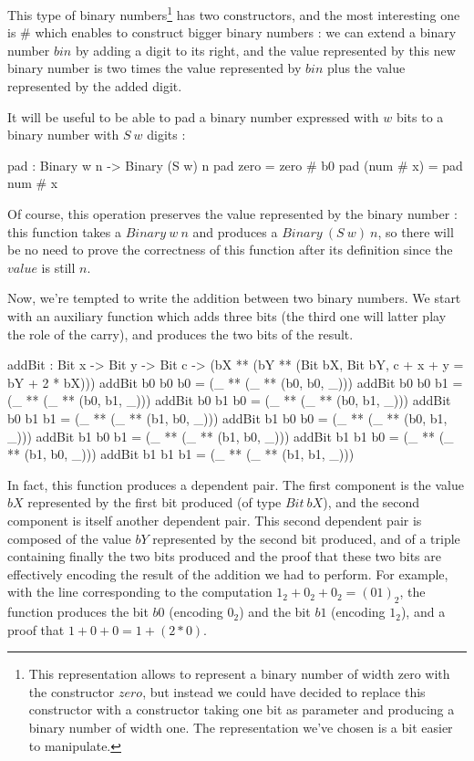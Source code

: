This type of binary numbers\footnote{This representation allows to represent a binary number of width zero with the constructor $zero$, but instead we could have decided to replace this constructor with a constructor taking one bit as parameter and producing a binary number of width one. The representation we've chosen is a bit easier to manipulate.}  has two constructors, and the most interesting one is $\#$ which enables to construct bigger binary numbers : we can extend a binary number $bin$ by adding a digit to its right, and the value represented by this new binary number is two times the value represented by $bin$ plus the value represented by the added digit.

It will be useful to be able to pad a binary number expressed with $w$ bits to a binary number with $S\ w$ digits : 
\begin{code}[caption=Padding, captionpos=b, label=lst1:haskell2]
pad : Binary w n -> Binary (S w) n
pad zero = zero # b0
pad (num # x) = pad num # x
\end{code}
Of course, this operation preserves the value represented by the binary number : this function takes a $Binary\ w\ n$ and produces a $Binary\ (S\ w)\ n$, so there will be no need to prove the correctness of this function after its definition since the $value$ is still $n$.

Now, we're tempted to write the addition between two binary numbers.
We start with an auxiliary function which adds three bits (the third one will latter play the role of the carry), and produces the two bits of the result.

\begin{code}[caption=Addition of three bits, captionpos=b, label=lst1:haskell2]
addBit : Bit x -> Bit y -> Bit c ->
          (bX ** (bY ** 
              (Bit bX, Bit bY, 
                  c + x + y = bY + 2 * bX)))
addBit b0 b0 b0 = (_ ** (_ ** (b0, b0, _)))
addBit b0 b0 b1 = (_ ** (_ ** (b0, b1, _)))
addBit b0 b1 b0 = (_ ** (_ ** (b0, b1, _)))
addBit b0 b1 b1 = (_ ** (_ ** (b1, b0, _)))
addBit b1 b0 b0 = (_ ** (_ ** (b0, b1, _)))
addBit b1 b0 b1 = (_ ** (_ ** (b1, b0, _)))
addBit b1 b1 b0 = (_ ** (_ ** (b1, b0, _)))
addBit b1 b1 b1 = (_ ** (_ ** (b1, b1, _)))
\end{code}

In fact, this function produces a dependent pair. The first component is the value $bX$ represented by the first bit produced (of type $Bit\ bX$), and the second component is itself another dependent pair. This second dependent pair is composed of the value $bY$ represented by the second bit produced, and of a triple containing finally the two bits produced and the proof that these two bits are effectively encoding the result of the addition we had to perform.
For example, with the line corresponding to the computation $1_2 + 0_2 + 0_2 = (01)_2$, the function produces the bit $b0$ (encoding $0_2$) and the bit $b1$ (encoding $1_2$), and a proof that $1 + 0 + 0 = 1 + (2*0)$.

